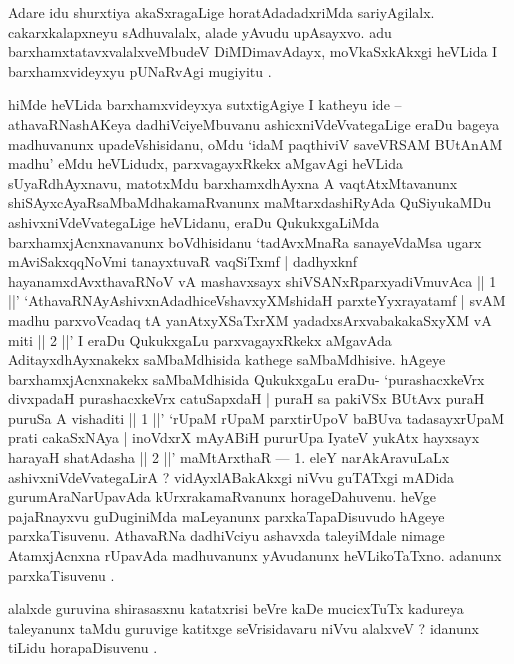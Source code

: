 \begin{center}


\end{center}

\begin{artha}
Adare idu shurxtiya akaSxragaLige horatAdadadxriMda sariyAgilalx. cakarxkalapxneyu  sAdhuvalalx, alade yAvudu upAsayxvo. adu barxhamxtatavxvalalxveMbudeV DiMDimavAdayx,  moVkaSxkAkxgi heVLida I barxhamxvideyxyu pUNaRvAgi mugiyitu .
\end{artha}

\begin{artha}
hiMde heVLida barxhamxvideyxya sutxtigAgiye I katheyu ide -- athavaRNashAKeya dadhiVciyeMbuvanu ashicxniVdeVvategaLige eraDu bageya madhuvanunx upadeVshisidanu, oMdu `idaM paqthiviV saveVRSAM BUtAnAM madhu' eMdu heVLidudx, parxvagayxRkekx aMgavAgi heVLida sUyaRdhAyxnavu, matotxMdu barxhamxdhAyxna A vaqtAtxMtavanunx shiSAyxcAyaRsaMbaMdhakamaRvanunx maMtarxdashiRyAda QuSiyukaMDu ashivxniVdeVvategaLige heVLidanu, eraDu QukukxgaLiMda barxhamxjAcnxnavanunx boVdhisidanu `tadAvxMnaRa sanayeVdaMsa ugarx mAviSakxqqNoVmi tanayxtuvaR vaqSiTxmf | dadhyxknf hayanamxdAvxthavaRNoV vA mashavxsayx shiVSANxRparxyadiVmuvAca || 1 ||' `AthavaRNAyAshivxnAdadhiceVshavxyXMshidaH parxteYyxrayatamf | svAM madhu parxvoVcadaq tA yanAtxyXSaTxrXM yadadxsArxvabakakaSxyXM vA miti || 2 ||' I eraDu QukukxgaLu parxvagayxRkekx aMgavAda AditayxdhAyxnakekx saMbaMdhisida kathege saMbaMdhisive. hAgeye barxhamxjAcnxnakekx saMbaMdhisida QukukxgaLu eraDu- `purashacxkeVrx divxpadaH purashacxkeVrx catuSapxdaH | puraH sa pakiVSx BUtAvx puraH puruSa A vishaditi || 1 ||' `rUpaM rUpaM parxtirUpoV baBUva tadasayxrUpaM prati cakaSxNAya | inoVdxrX mAyABiH pururUpa IyateV yukAtx hayxsayx harayaH shatAdasha || 2 ||'  maMtArxthaR {\rm ---}  1. eleY narAkAravuLaLx ashivxniVdeVvategaLirA ? vidAyxlABakAkxgi niVvu guTATxgi mADida gurumAraNarUpavAda kUrxrakamaRvanunx horageDahuvenu. heVge pajaRnayxvu guDuginiMda maLeyanunx parxkaTapaDisuvudo hAgeye parxkaTisuvenu. AthavaRNa \-dadhiVciyu ashavxda taleyiMdale nimage AtamxjAcnxna rUpavAda madhuvanunx yAvudanunx heVLikoTaTxno. adanunx parxkaTisuvenu .
\end{artha}

\begin{artha}
alalxde guruvina shirasasxnu katatxrisi beVre kaDe mucicxTuTx kadureya taleyanunx taMdu guruvige katitxge seVrisidavaru niVvu alalxveV ? idanunx tiLidu horapaDisuvenu .
\end{artha}

